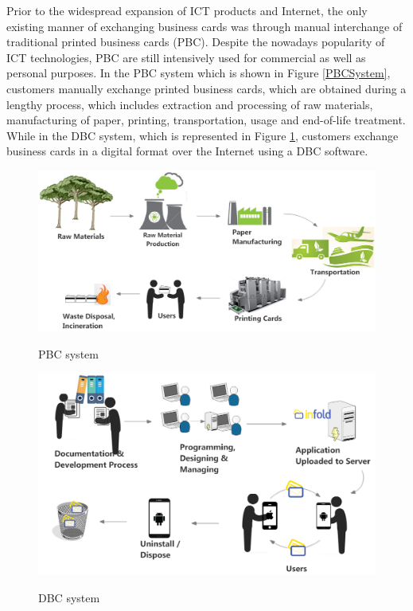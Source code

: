 \documentclass[3p,times,procedia]{elsarticle}
\begin{document}
Prior to the widespread expansion of ICT products and Internet, the only existing manner of exchanging business cards was through manual interchange of traditional printed business cards (PBC). Despite the nowadays popularity of ICT technologies, PBC are still intensively used for commercial as well as personal purposes. In the PBC system which is shown in Figure \ref{PBCSystem}, customers manually exchange printed business cards, which are obtained during a lengthy process, which includes extraction and processing of raw materials, manufacturing of paper, printing, transportation, usage and end-of-life treatment. While in the DBC system, which is represented in Figure \ref{DBCSystem}, customers exchange business cards in a digital format over the Internet using a DBC software.\\

\begin{figure}[t]
\includegraphics[width=\linewidth]{PBCSystem1.png}
\label{PBCSystem}
\caption{PBC system}\vspace*{-6pt}
\endminipage\hfill
{}
\includegraphics[width=\linewidth]{DBCSystem.png}
\label{DBCSystem}
\caption{DBC system}\vspace*{-6pt}
\endminipage\hfill
\end{figure}
\end{document}
